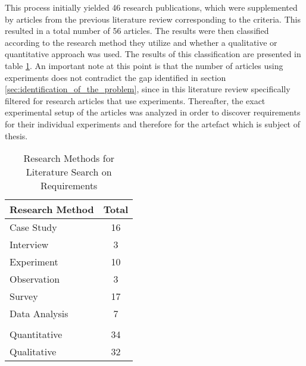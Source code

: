 
This process initially yielded 46 research publications, which were supplemented by articles from the previous literature review corresponding to the criteria. This resulted in a total number of 56 articles. The results were then classified according to the research method they utilize and whether a qualitative or quantitative approach was used. The results of this classification are presented in table \ref{tab:secondLiteratureSearch}. An important note at this point is that the number of articles using experiments does not contradict the gap identified in section \ref{sec:identification_of_the_problem}, since in this literature review specifically filtered for research articles that use experiments. Thereafter, the exact experimental setup of the articles was analyzed in order to discover requirements for their individual experiments and therefore for the artefact which is subject of thesis.

\begin{table}[htbp]
    \centering
    \small
    \begin{tabular}{ll}
    \hline
    \multicolumn{1}{l}{Research Method} & \multicolumn{1}{l}{Total} \\ \hline
    \multicolumn{1}{l}{Case  Study}     & \multicolumn{1}{c}{16}    \\ 
    \multicolumn{1}{l}{Interview}       & \multicolumn{1}{c}{3}     \\ 
    \multicolumn{1}{l}{Experiment}      & \multicolumn{1}{c}{10}    \\ 
    \multicolumn{1}{l}{Observation}     & \multicolumn{1}{c}{3}     \\ 
    \multicolumn{1}{l}{Survey}          & \multicolumn{1}{c}{17}    \\ 
    \multicolumn{1}{l}{Data Analysis}   & \multicolumn{1}{c}{7}     \\ 
                                            &                            \\ \hline
    \multicolumn{1}{l}{Quantitative}    & \multicolumn{1}{c}{34}    \\ 
    \multicolumn{1}{l}{Qualitative}     & \multicolumn{1}{c}{32}    \\ \hline
    \end{tabular}
    \caption[Research Methods for Literature Search on Requirements]{Research Methods for Literature Search on Requirements}\label{tab:secondLiteratureSearch}
    \end{table}

